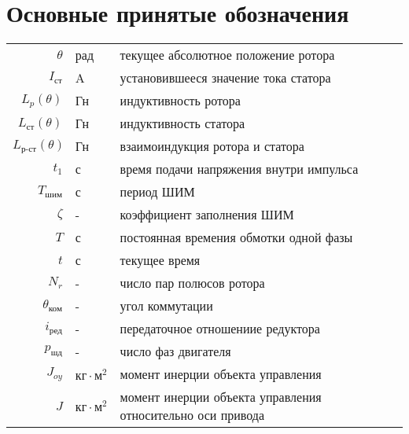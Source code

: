 \newpage
\section{Основные принятые обозначения}

\begin{table}[ht!]
    \begin{tabular}{rll}
    $\theta$            & рад & текущее абсолютное положение ротора \\

    $I_{\text{ст}}$     & A & установившееся значение тока статора \\

    $L_{p}(\theta)$     & Гн & индуктивность ротора \\

    $L_{\text{ст}}(\theta)$     & Гн & индуктивность статора \\

    $L_{\text{р-ст}}(\theta)$   & Гн & взаимоиндукция ротора и статора \\

    $t_{1}$             & с & время подачи напряжения внутри импульса \\

    $T_\text{шим}$      & с & период ШИМ \\

    $\zeta$             & - & коэффициент заполнения ШИМ \\

    $T$                 & с & постоянная времения обмотки одной фазы \\

    $t$                 & с & текущее время \\

    $N_{r}$             & - & число пар полюсов ротора \\

    $\theta_{\text{ком}}$& - & угол коммутации \\

    $i_\text{ред}$      & - & передаточное отношениие редуктора \\

    $p_{\text{шд}}$     & - & число фаз двигателя \\

    $J_{oy}$            & $\text{кг} \cdot \text{м}^{2}$ & момент инерции объекта управления \\

    $J$                 & $\text{кг} \cdot \text{м}^{2}$ & момент инерции объекта управления относительно оси привода \\


\end{tabular}
\end{table}
